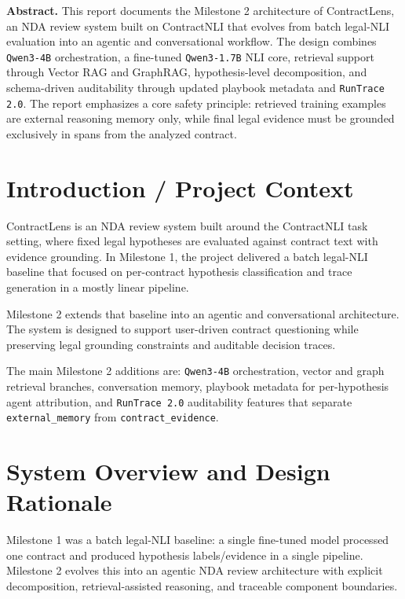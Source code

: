 \documentclass[11pt]{article}
\begin{document}
\tableofcontents
\newpage

\begin{abstractbox}
\textbf{Abstract.} This report documents the Milestone 2 architecture of ContractLens, an NDA review system built on ContractNLI that evolves from batch legal-NLI evaluation into an agentic and conversational workflow. The design combines \texttt{Qwen3-4B} orchestration, a fine-tuned \texttt{Qwen3-1.7B} NLI core, retrieval support through Vector RAG and GraphRAG, hypothesis-level decomposition, and schema-driven auditability through updated playbook metadata and \texttt{RunTrace 2.0}. The report emphasizes a core safety principle: retrieved training examples are external reasoning memory only, while final legal evidence must be grounded exclusively in spans from the analyzed contract.
\end{abstractbox}

\section{Introduction / Project Context}
ContractLens is an NDA review system built around the ContractNLI task setting, where fixed legal hypotheses are evaluated against contract text with evidence grounding. In Milestone 1, the project delivered a batch legal-NLI baseline that focused on per-contract hypothesis classification and trace generation in a mostly linear pipeline.

Milestone 2 extends that baseline into an agentic and conversational architecture. The system is designed to support user-driven contract questioning while preserving legal grounding constraints and auditable decision traces.

The main Milestone 2 additions are: \texttt{Qwen3-4B} orchestration, vector and graph retrieval branches, conversation memory, playbook metadata for per-hypothesis agent attribution, and \texttt{RunTrace 2.0} auditability features that separate \texttt{external\_memory} from \texttt{contract\_evidence}.

\section{System Overview and Design Rationale}
Milestone 1 was a batch legal-NLI baseline: a single fine-tuned model processed one contract and produced hypothesis labels/evidence in a single pipeline. Milestone 2 evolves this into an agentic NDA review architecture with explicit decomposition, retrieval-assisted reasoning, and traceable component boundaries.
\end{document}
